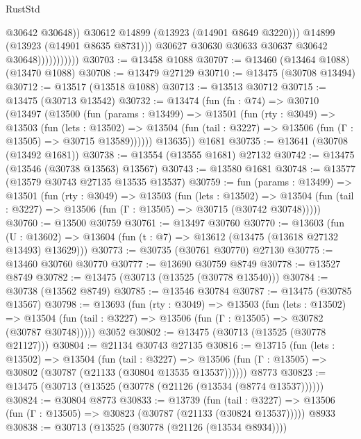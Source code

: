 \begin{lexlean}{RustStd}
\begin{coremodule}
                                  @30642
                                  @30648))
                              @30612
                              @14899
                              (@13923 (@14901 @8649 @3220)))
                            @14899
                            (@13923 (@14901 @8635 @8731)))
                          @30627
                          @30630
                          @30633
                          @30637
                          @30642
                          @30648)))))))))))
@30703 := @13458 @1088
@30707 := @13460 (@13464 @1088) (@13470 @1088)
@30708 := @13479 @27129
@30710 := @13475 (@30708 @13494)
@30712 := @13517 (@13518 @1088)
@30713 := @13513 @30712
@30715 := @13475 (@30713 @13542)
@30732 := @13474
    (fun (fn : @74) =>
    @30710
      (@13497
        (@13500
          (fun (params : @13499) =>
          @13501
            (fun (rty : @3049) =>
            @13503
              (fun (lets : @13502) =>
              @13504 (fun (tail : @3227) => @13506 (fun (Γ : @13505) => @30715 @13589))))))
        @13635))
    @1681
@30735 := @13641 (@30708 (@13492 @1681))
@30738 := @13554 (@13555 @1681) @27132
@30742 := @13475 (@13546 (@30738 @13563) @13567)
@30743 := @13580 @1681
@30748 := @13577 (@13579 @30743 @27135 @13535 @13537)
@30759 := fun (params : @13499) =>
  @13501
    (fun (rty : @3049) =>
    @13503
      (fun (lets : @13502) =>
      @13504 (fun (tail : @3227) => @13506 (fun (Γ : @13505) => @30715 (@30742 @30748)))))
@30760 := @13500 @30759
@30761 := @13497 @30760
@30770 := @13603
    (fun (U : @13602) => @13604 (fun (t : @7) => @13612 (@13475 (@13618 @27132 @13493) @13629)))
@30773 := @30735 (@30761 @30770) @27130
@30775 := @13460 @30760 @30770
@30777 := @13690 @30759 @8749
@30778 := @13527 @8749
@30782 := @13475 (@30713 (@13525 (@30778 @13540)))
@30784 := @30738 (@13562 @8749)
@30785 := @13546 @30784
@30787 := @13475 (@30785 @13567)
@30798 := @13693
    (fun (rty : @3049) =>
    @13503
      (fun (lets : @13502) =>
      @13504 (fun (tail : @3227) => @13506 (fun (Γ : @13505) => @30782 (@30787 @30748)))))
    @3052
@30802 := @13475 (@30713 (@13525 (@30778 @21127)))
@30804 := @21134 @30743 @27135
@30816 := @13715
    (fun (lets : @13502) =>
    @13504
      (fun (tail : @3227) =>
      @13506 (fun (Γ : @13505) => @30802 (@30787 (@21133 (@30804 @13535 @13537))))))
    @8773
@30823 := @13475 (@30713 (@13525 (@30778 (@21126 (@13534 (@8774 @13537))))))
@30824 := @30804 @8773
@30833 := @13739
    (fun (tail : @3227) => @13506 (fun (Γ : @13505) => @30823 (@30787 (@21133 (@30824 @13537)))))
    @8933
@30838 := @30713 (@13525 (@30778 (@21126 (@13534 @8934))))

\end{coremodule}
\end{lexlean}
